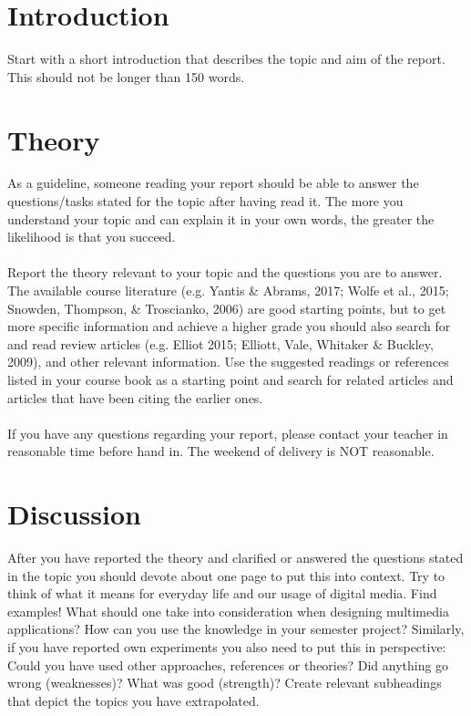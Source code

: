 \documentclass[11pt,a4paper,oneside,table,xcdraw]{article}
\begin{document}
	\section{Introduction}
	Start with a short introduction that describes the topic and aim of the report. This should not be longer than 150 words.
	\section{Theory}
	As a guideline, someone reading your report should be able to answer the questions/tasks stated for the topic after having read it. The more you understand your topic and can explain it in your own words, the greater the likelihood is that you succeed.\\\\
	Report the theory relevant to your topic and the questions you are to answer. The available course literature (e.g. Yantis \& Abrams, 2017; Wolfe et al., 2015; Snowden, Thompson, \& Troscianko, 2006) are good starting points, but to get more specific information and achieve a higher grade you should also search for and read review articles (e.g. Elliot 2015; Elliott, Vale, Whitaker \& Buckley, 2009), and other relevant information. Use the suggested readings or references listed in your course book as a starting point and search for related articles and articles that have been citing the earlier ones.\\\\
	If you have any questions regarding your report, please contact your teacher in reasonable time before hand in. The weekend of delivery is NOT reasonable.
	\section{Discussion}
	After you have reported the theory and clarified or answered the questions stated in
	the topic you should devote about one page to put this into context. Try to think of
	what it means for everyday life and our usage of digital media. Find examples! What
	should one take into consideration when designing multimedia applications? How can
	you use the knowledge in your semester project?
	Similarly, if you have reported own experiments you also need to put this in
	perspective: Could you have used other approaches, references or theories? Did
	anything go wrong (weaknesses)? What was good (strength)? Create relevant
	subheadings that depict the topics you have extrapolated. 
	
\end{document}
